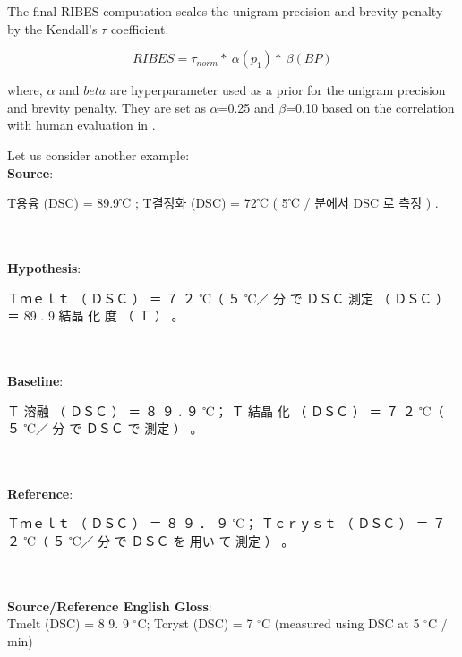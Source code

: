 The final RIBES computation scales the unigram precision and brevity penalty by the Kendall's $\tau$ coefficient.

\begin{equation}
RIBES = \tau_{norm} *\ \alpha (p_{1}) *\ \beta (BP)
\end{equation}

where, $\alpha$ and $beta$ are hyperparameter used as a prior for the unigram precision and brevity penalty. They are set as $\alpha$=0.25 and $\beta$=0.10 based on the correlation with human evaluation in \citep{isozaki2010automatic}. 

Let us consider another example:
\\[0.9em]
\noindent \textbf{Source}: \\
\begin{CJK*}{UTF8}{}\begin{korean}T용융 (DSC) = 89.9℃ ; T결정화 (DSC) = 72℃ ( 5℃ / 분에서 DSC 로 측정 ) .\end{korean}\end{CJK*}
\\ \\
\noindent \textbf{Hypothesis}:  \\
\begin{CJK*}{UTF8}{min}Ｔｍｅｌｔ （ ＤＳＣ ） ＝ ７ ２ ℃（ ５ ℃／ 分 で ＤＳＣ 測定 （ ＤＳＣ ） ＝ 89 . 9 結晶 化 度 （ Ｔ ） 。 \end{CJK*}
\\ \\
\noindent \textbf{Baseline}:  \\
\begin{CJK*}{UTF8}{min}Ｔ 溶融 （ ＤＳＣ ） ＝ ８ ９ . ９ ℃； Ｔ 結晶 化 （ ＤＳＣ ） ＝ ７ ２ ℃（ ５ ℃／ 分 で ＤＳＣ で 測定 ） 。\end{CJK*}
\\ \\
\noindent \textbf{Reference}: \\
\begin{CJK*}{UTF8}{min}Ｔｍｅｌｔ （ ＤＳＣ ） ＝ ８ ９ ． ９ ℃； Ｔｃｒｙｓｔ （ ＤＳＣ ） ＝ ７ ２ ℃（ ５ ℃／ 分 で ＤＳＣ を 用い て 測定 ） 。\end{CJK*}
\\ \\
\textbf{Source/Reference English Gloss}: \\
Tmelt (DSC) = 8 9. 9 $^{\circ}$C; Tcryst (DSC) = 7 $^{\circ}$C (measured using DSC at 5 $^{\circ}$C / min)
\vspace{5mm}


